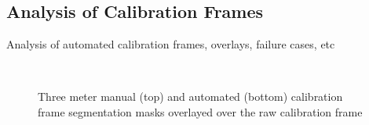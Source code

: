 \subsection{Analysis of Calibration Frames}

Analysis of automated calibration frames, overlays, failure cases, etc

\begin{figure}[htbp]
    \centering
    \\[1mm]
    \caption{Three meter manual (top) and automated (bottom) calibration frame segmentation masks overlayed over
    the raw calibration frame}
    \label{fig:3m_mask_overlays}
\end{figure}

